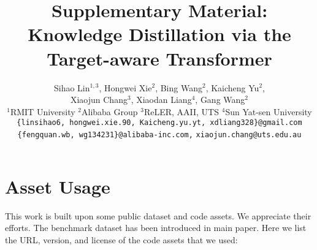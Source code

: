\documentclass[10pt,onecolumn,letterpaper]{article}
\begin{document}
\title{Supplementary Material:\\ Knowledge Distillation via the Target-aware Transformer}

\author{Sihao Lin$^{1,3}$\footnotemark[2]\;,\;
Hongwei Xie$^{2}$\footnotemark[2]\;,\;
Bing Wang$^{2}$,\;
Kaicheng Yu$^{2}$,\\
Xiaojun Chang$^{3}$\footnotemark[4]\;,\;
Xiaodan Liang$^{4}$,\;
Gang Wang$^{2}$\\
$^1$RMIT University\;
$^2$Alibaba Group\;
$^3$ReLER, AAII, UTS\;
$^4$Sun Yat-sen University\\
{\tt\small \{linsihao6, hongwei.xie.90, Kaicheng.yu.yt, xdliang328\}@gmail.com}\\
{\tt\small \{fengquan.wb, wg134231\}@alibaba-inc.com,}\;
{\tt\small xiaojun.chang@uts.edu.au}
}
\maketitle

\section{Asset Usage }
\label{sec:asset}
This work is built upon some public dataset and code assets. We appreciate their efforts. 
The benchmark dataset has been introduced in main paper. Here we list the URL, version, and license of the code assets that we used:
\end{document}
